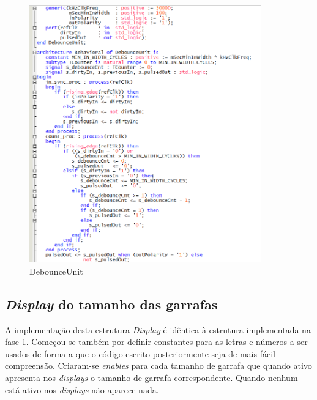 \documentclass{report}
\begin{document}
\begin{figure}[H]
    \centering
    \includegraphics[width = 10cm]{Debounce.png}
    \caption{DebounceUnit }
    \label{fig:Debounce}
\end{figure}

\newpage

\subsection{\textit{Display} do tamanho das garrafas}

A implementação desta estrutura \textit{Display} é idêntica à estrutura implementada na fase 1. Começou-se também por definir constantes para as letras e números a ser usados de forma a que o código escrito posteriormente seja de mais fácil compreensão. Criaram-se \textit{enables} para cada tamanho de garrafa que quando ativo apresenta nos \textit{displays} o tamanho de garrafa correspondente. Quando nenhum está ativo nos \textit{displays} não aparece nada.
\end{document}
